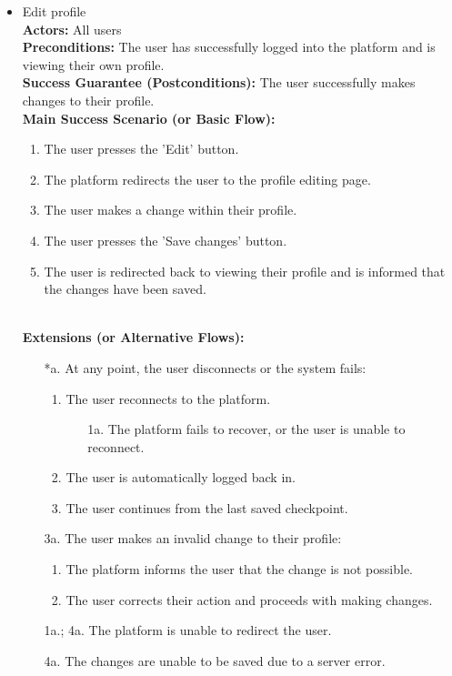 \begin{itemize}[label={[\textbf{UC}]}, align=left, leftmargin=*]
        
     \item {} Edit profile \\
     \textbf{Actors:} All users\\
     \textbf{Preconditions:} The user has successfully logged into the platform and is viewing their own profile.\\
     \textbf{Success Guarantee (Postconditions):} The user successfully makes changes to their profile. \\
     \textbf{Main Success Scenario (or Basic Flow):} 
     \begin{enumerate}[label=\arabic*.] 
        \item The user presses the 'Edit' button.
        \item The platform redirects the user to the profile editing page.
        \item The user makes a change within their profile.
        \item The user presses the 'Save changes' button.
        \item The user is redirected back to viewing their profile and is informed that the changes have been saved.
     \end{enumerate} \\

    \textbf{Extensions (or Alternative Flows):} 
    \begin{enumerate}[label=\arabic*.]
        \item[*a.] At any point, the user disconnects or the system fails:
            \begin{enumerate}[label=\arabic*.]
                \item The user reconnects to the platform.
                    \begin{enumerate}[label=\alph*.]
                        \item[1a.] The platform fails to recover, or the user is unable to reconnect.
                    \end{enumerate}
                 \item The user is automatically logged back in.
                 \item The user continues from the last saved checkpoint.
            \end{enumerate}
        \item[3a.] The user makes an invalid change to their profile:
            \begin{enumerate}[label=\arabic*.]
                \item The platform informs the user that the change is not possible.
                \item The user corrects their action and proceeds with making changes.
            \end{enumerate}
        \item[1a.; 4a.] The platform is unable to redirect the user.
        \item[4a.] The changes are unable to be saved due to a server error.
        \end{enumerate}
\end{itemize}


